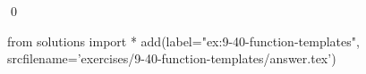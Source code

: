 
\begin{ex}
  \label{ex:9-40-function-templates}
  
  \qed
\end{ex}
\begin{python0}
from solutions import *
add(label="ex:9-40-function-templates",
    srcfilename='exercises/9-40-function-templates/answer.tex')
\end{python0}
